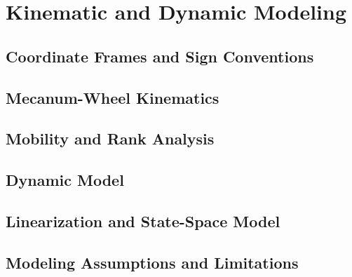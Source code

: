 \chapter{Kinematic and Dynamic Modeling}

\section{Coordinate Frames and Sign Conventions}

\section{Mecanum-Wheel Kinematics}

\section{Mobility and Rank Analysis}

\section{Dynamic Model}

\section{Linearization and State-Space Model}

\section{Modeling Assumptions and Limitations}

